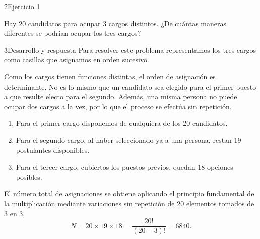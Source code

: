 \documentclass[practices.tex]{subfiles}%
\begin{document}
\h2{Ejercicio 1}

Hay 20 candidatos para ocupar 3 cargos distintos. ¿De cuántas maneras diferentes se podrían ocupar los tres cargos?

\h3{Desarrollo y respuesta}
Para resolver este problema representamos los tres cargos como casillas que asignamos en orden sucesivo.

Como los cargos tienen funciones distintas, el orden de asignación es determinante. No es lo mismo que un candidato sea elegido para el primer puesto a que resulte electo para el segundo. Además, una misma persona no puede ocupar dos cargos a la vez, por lo que el proceso se efectúa sin repetición.

\begin{enumerate}
    \item Para el primer cargo disponemos de cualquiera de los 20 candidatos.
    \item Para el segundo cargo, al haber seleccionado ya a una persona, restan 19 postulantes disponibles.
    \item Para el tercer cargo, cubiertos los puestos previos, quedan 18 opciones posibles.
\end{enumerate}

El número total de asignaciones se obtiene aplicando el principio fundamental de la multiplicación mediante variaciones sin repetición de 20 elementos tomados de 3 en 3,
\begin{equation*}
    N = 20 \times 19 \times 18 = \frac{20!}{(20 - 3)!} = 6840.
\end{equation*}

\end{document}
